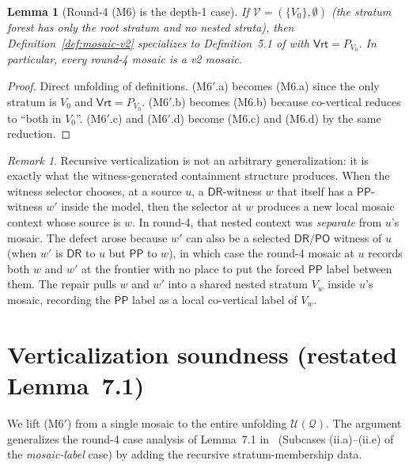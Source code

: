 \documentclass[11pt]{article}
\newtheorem{lemma}[theorem]{Lemma}
\theoremstyle{definition}
\theoremstyle{remark}
\newtheorem{remark}[theorem]{Remark}
\newcommand{\DR}{\mathsf{DR}}
\newcommand{\PO}{\mathsf{PO}}
\newcommand{\PP}{\mathsf{PP}}
\newcommand{\Vrt}{\mathsf{Vrt}}
\newcommand{\Q}{\mathcal{Q}}
\newcommand{\U}{\mathcal{U}}
\begin{document}
\begin{lemma}[Round-4 (M6) is the depth-1 case]\label{lem:round4-recovery}
If $\mathcal V=(\{V_0\},\emptyset)$ (the stratum forest has only the
root stratum and no nested strata), then Definition~\ref{def:mosaic-v2}
specializes to Definition~5.1 of \cite{GPT55Repaired} with
$\Vrt=P_{V_0}$.  In particular, every round-4 mosaic is a v2 mosaic.
\end{lemma}

\begin{proof}
Direct unfolding of definitions.  (M6$'$.a) becomes (M6.a) since the
only stratum is $V_0$ and $\Vrt=P_{V_0}$.  (M6$'$.b) becomes (M6.b)
because co-vertical reduces to ``both in $V_0$''.  (M6$'$.c) and
(M6$'$.d) become (M6.c) and (M6.d) by the same reduction.
\end{proof}

\begin{remark}\label{rem:why-recursive}
Recursive verticalization is not an arbitrary generalization: it is
exactly what the witness-generated containment structure produces.
When the witness selector chooses, at a source $u$, a $\DR$-witness
$w$ that itself has a $\PP$-witness $w'$ inside the model, then the
selector at $w$ produces a new local mosaic context whose source is
$w$.  In round-4, that nested context was \emph{separate} from $u$'s
mosaic.  The defect arose because $w'$ can also be a selected
$\DR/\PO$ witness of $u$ (when $w'$ is $\DR$ to $u$ but $\PP$ to $w$),
in which case the round-4 mosaic at $u$ records both $w$ and $w'$ at
the frontier with no place to put the forced $\PP$ label between
them.  The repair pulls $w$ and $w'$ into a shared nested stratum
$V_w$ inside $u$'s mosaic, recording the $\PP$ label as a local
co-vertical label of $V_w$.
\end{remark}

\section{Verticalization soundness (restated Lemma~7.1)}
\label{sec:lifting}

We lift (M6$'$) from a single mosaic to the entire unfolding $\U(\Q)$.
The argument generalizes the round-4 case analysis of
Lemma~7.1 in~\cite{GPT55Repaired} (Subcases (ii.a)--(ii.e) of the
\emph{mosaic-label} case) by adding the recursive stratum-membership
data.
\end{document}
